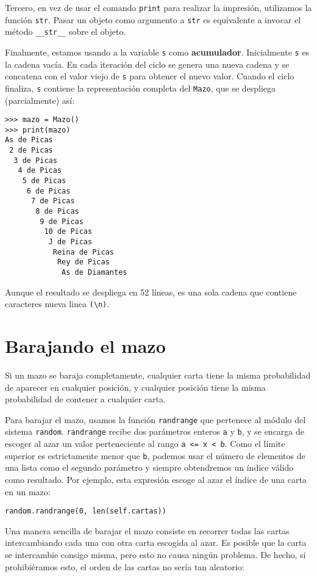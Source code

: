 Tercero, en vez de usar el comando \texttt{print} para realizar la
impresión, utilizamos la función \texttt{str}. Pasar un objeto como
argumento a \texttt{str} es equivalente a invocar el método \texttt{\_\_str\_\_}
sobre el objeto.


Finalmente, estamos usando a la variable \texttt{s} como \textbf{acumulador}.
Inicialmente \texttt{s} es la cadena vacía. En cada iteración del
ciclo se genera una nueva cadena y se concatena con el valor viejo
de \texttt{s} para obtener el nuevo valor. Cuando el ciclo finaliza,
\texttt{s} contiene la representación completa del \texttt{Mazo},
que se despliega (parcialmente) así:

\begin{lstlisting}
>>> mazo = Mazo()
>>> print(mazo)
As de Picas
 2 de Picas
  3 de Picas
   4 de Picas
    5 de Picas
     6 de Picas
      7 de Picas
       8 de Picas
        9 de Picas
         10 de Picas
          J de Picas
           Reina de Picas
            Rey de Picas
             As de Diamantes
\end{lstlisting}
 Aunque el resultado se despliega en 52 líneas, es una sola cadena
que contiene caracteres nueva linea \verb+(\n)+.

\section{Barajando el mazo}


Si un mazo se baraja completamente, cualquier carta tiene la misma
probabilidad de aparecer en cualquier posición, y cualquier posición
tiene la misma probabilidad de contener a cualquier carta.

 

Para barajar el mazo, usamos la función \texttt{randrange} que pertenece
al módulo del sistema \texttt{random}. \texttt{randrange} recibe dos
parámetros enteros \texttt{a} y \texttt{b}, y se encarga de escoger
al azar un valor perteneciente al rango \texttt{a <= x < b}. Como
el límite superior es estrictamente menor que \texttt{b}, podemos
usar el número de elementos de una lista como el segundo parámetro
y siempre obtendremos un índice válido como resultado. Por ejemplo,
esta expresión escoge al azar el índice de una carta en un mazo:

\begin{lstlisting}
random.randrange(0, len(self.cartas))
\end{lstlisting}
 Una manera sencilla de barajar el mazo consiste en recorrer todas
las cartas intercambiando cada una con otra carta escogida al azar.
Es posible que la carta se intercambie consigo misma, pero esto no
causa ningún problema. De hecho, si prohibiéramos esto, el orden de
las cartas no sería tan aleatorio:

